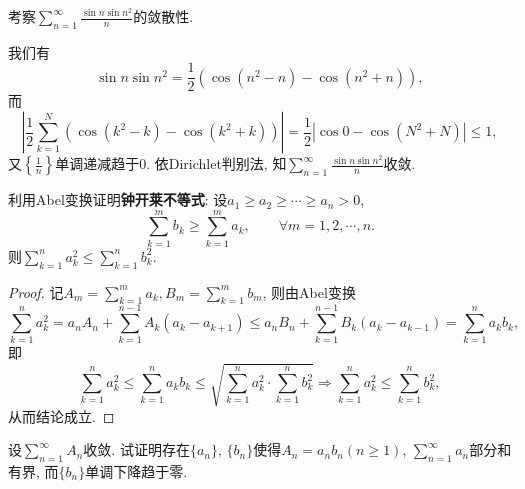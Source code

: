 \begin{quiza}
\begin{solution}
\end{solution}
\woe 考察\(\sum_{n=1}^{\infty}\frac{\sin n\sin n^2}{n}\)的敛散性.
\begin{solution}
我们有\[\sin n\sin n^2=\frac{1}{2}\left(\cos (n^2-n)-\cos(n^2+n)\right),\]而\[\left|\frac{1}{2}\sum_{k=1}^{N}\left(\cos (k^2-k)-\cos(k^2+k)\right)\right|=\frac{1}{2}\left|\cos 0-\cos (N^2+N)\right|\leqslant 1,\]又\(\left\lbrace\frac{1}{n}\right\rbrace\)单调递减趋于0. 依Dirichlet判别法, 知\(\sum_{n=1}^{\infty}\frac{\sin n\sin n^2}{n}\)收敛.
\end{solution}
\end{quiza}
\begin{quizb}
\woe 利用Abel变换证明\textbf{钟开莱不等式}: 设\(a_1\geqslant a_2\geqslant\cdots\geqslant a_n>0\), \[\sum_{k=1}^{m}b_k\geqslant \sum_{k=1}^{m}a_k,\qquad\forall m=1,2,\cdots,n.\]则\(\sum_{k=1}^{n}a_k^2\leqslant\sum_{k=1}^{n}b_k^2.\)
\begin{proof}
记\(A_m=\sum_{k=1}^{m}a_k,B_m=\sum_{k=1}^{m}b_m\), 则由Abel变换\[\sum_{k=1}^{n}a_k^2=a_nA_n+\sum_{k=1}^{n-1}A_k(a_k-a_{k+1})\leqslant a_nB_n+\sum_{k=1}^{n-1}B_k(a_{k}-a_{k-1})=\sum_{k=1}^{n}a_kb_k,\]即\[\sum_{k=1}^{n}a_k^2\leqslant\sum_{k=1}^{n}a_kb_k\leqslant\sqrt{\sum_{k=1}^{n}a_k^2\cdot\sum_{k=1}^{n}b_k^2}\Rightarrow\sum_{k=1}^{n}a_k^2\leqslant\sum_{k=1}^{n}b_k^2,\]从而结论成立.
\end{proof}
\woe 设\(\sum_{n=1}^{\infty}A_n\)收敛. 试证明存在\(\{a_n\},\,\{b_n\}\)使得\(A_n=a_nb_n(n\geqslant 1)\), \(\sum_{n=1}^{\infty}a_n\)部分和有界, 而\(\{b_n\}\)单调下降趋于零.
\begin{solution}


\end{solution}
\end{quizb}
